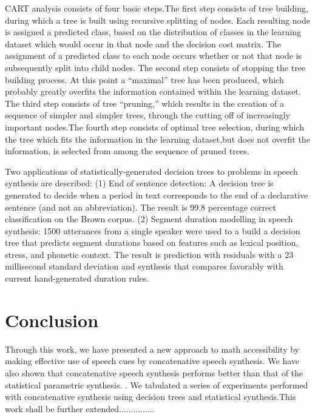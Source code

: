\documentclass{article}
\begin{document}
 CART analysis consists of four basic steps.The first step consists of tree building, during which a tree is built using recursive splitting of nodes. Each resulting node is assigned a predicted class, based on the distribution of classes in the learning dataset which would occur in that node and the decision cost matrix. The assignment of a predicted class to each node occurs whether or not that node is subsequently split into child nodes. The second step consists of stopping the tree building process. At this point a “maximal” tree has been produced, which probably greatly overfits the information contained within the learning dataset.  The third step consists of tree “pruning,” which results in the creation of a sequence of simpler and simpler trees, through the cutting off of increasingly important nodes.The fourth step consists of optimal tree selection, during which the tree which fits the information in the learning dataset,but does not overfit the information, is selected from among the sequence of pruned trees.
   
 Two applications of statistically-generated decision trees to problems in speech synthesis are described: (1) End of sentence detection: A decision tree is generated to decide when a period in text corresponds to the end of a declarative sentence (and not an abbreviation). The result is 99.8 percentage correct classification on the Brown corpus. (2) Segment duration modelling in speech synthesis: 1500 utterances from a single speaker were used to a build a decision tree that predicts segment durations based on features such as lexical position, stress, and phonetic context. The result is prediction with residuals with a 23 millisecond standard deviation and synthesis that compares favorably with current hand-generated duration rules.







\section{Conclusion}

 Through this work, we have  presented a new approach to math accessibility by making effective use of speech cues by concatenative speech synthesis. We have also shown that concatenative speech synthesis performs better than that of the statistical parametric synthesis.
. We tabulated a series of experiments performed with  concatenative synthesis using decision trees and statistical synthesis.This work shall be further extended...............
\end{document}
